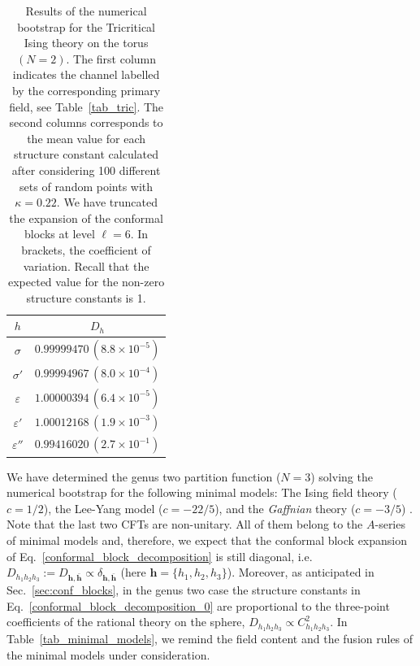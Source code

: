 \documentclass[a4paper,11pt]{article}
\begin{document}
\begin{table}[tbp]
\centering
\begin{tabular}{|c|c|}
\hline 
  $h$ &  $D_{h}$ \\ 
 \hline
 $\sigma$        &  $0.99999470\,(8.8\times 10^{-5})$  \\
 $\sigma'$       &  $0.99994967\,(8.0\times 10^{-4})$  \\
 $\varepsilon$   &  $1.00000394\,(6.4\times 10^{-5})$ \\
 $\varepsilon'$  &  $1.00012168\,(1.9\times 10^{-3})$  \\
 $\varepsilon''$ &  $0.99416020\,(2.7\times 10^{-1})$\\
 \hline
\end{tabular}
\caption{\label{tab_tric_results} Results of the numerical bootstrap for the Tricritical 
Ising theory on the torus $(N=2)$. The first column indicates the channel labelled by the
corresponding primary field, see Table~\ref{tab_tric}. The second columns corresponds to the mean value for 
each structure constant calculated after considering 100 different sets of random points with $\kappa=0.22$. 
We have truncated the expansion of the conformal blocks at level $\ell=6$. In brackets, the 
coefficient of variation. Recall that the expected value for the non-zero structure constants 
is 1.}
\end{table}



We have determined the genus two partition function ($N=3$)  solving the numerical bootstrap for the following  minimal models: The Ising field theory ($c=1/2$), the 
Lee-Yang model ($c=-22/5$), and the \textit{Gaffnian} theory 
($c=-3/5$) \cite{Simon,Ardonne}. Note that the last two CFTs are non-unitary. All of them 
belong to the $A$-series of minimal models and, therefore, we expect that the conformal block expansion of Eq.~\eqref{conformal_block_decomposition} is still diagonal, i.e. 
$D_{h_1h_2h_3}:=D_{\boldsymbol{h}, \boldsymbol{\bar{h}}}\propto 
\delta_{\boldsymbol{h}, \boldsymbol{\bar{h}}}$ (here $\boldsymbol{h}=\{h_1, h_2, h_3\}$). Moreover, as anticipated in Sec.~\ref{sec:conf_blocks}, 
in the genus two case the structure constants in Eq.~\eqref{conformal_block_decomposition_0} are proportional to the three-point coefficients of the rational theory on the sphere, 
$D_{h_1h_2h_3}\propto C_{h_1h_2h_3}^2$. In Table~\ref{tab_minimal_models}, we remind the 
field content and the fusion rules of the minimal models under consideration. 
\end{document}
